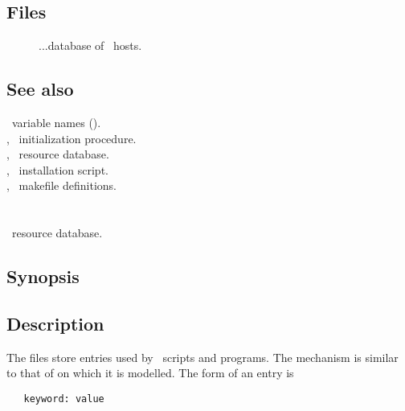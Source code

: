 \subsection*{Files}

\begin{description}
\item[]
...database of \aipspp\ hosts.
\end{description}

\subsection*{See also}

\aipspp\ variable names ().\\
, \aipspp\ initialization procedure.\\
, \aipspp\ resource database.\\
, \aipspp\ installation script.\\
, \aipspp\ makefile definitions.


\newpage
\section{}
\label{aipsrc}

\aipspp\ resource database.

\subsection*{Synopsis}

\begin{synopsis}
\end{synopsis}

\subsection*{Description}

The  files store  entries used by \aipspp\ 
scripts and programs.  The mechanism is similar to that of 
on which it is modelled.  The form of an \file{aipsrc} entry is

\begin{verbatim}
   keyword: value
\end{verbatim}

